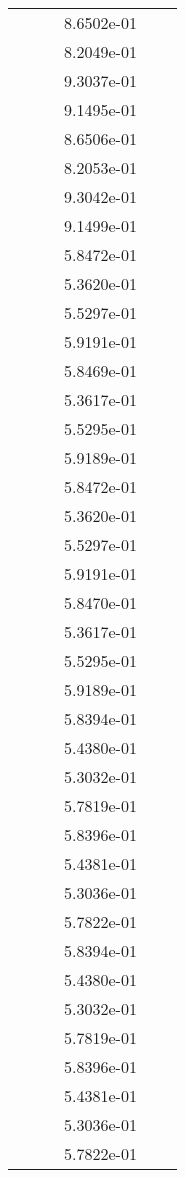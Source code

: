 \begin{xltabular}{\textwidth}{r|rS[table-format=1.3e+2]S[table-format=1.4e+2]S[table-format=1.4e+2]S[table-format=-1.5]}
&  &  & 8.6502e-01 & & \\
&  &  & 8.2049e-01 & & \\
&  &  & 9.3037e-01 & & \\
&  &  & 9.1495e-01 & & \\
&  &  & 8.6506e-01 & & \\
&  &  & 8.2053e-01 & & \\
&  &  & 9.3042e-01 & & \\
&  &  & 9.1499e-01 & & \\
&  &  & 5.8472e-01 & & \\
&  &  & 5.3620e-01 & & \\
&  &  & 5.5297e-01 & & \\
&  &  & 5.9191e-01 & & \\
&  &  & 5.8469e-01 & & \\
&  &  & 5.3617e-01 & & \\
&  &  & 5.5295e-01 & & \\
&  &  & 5.9189e-01 & & \\
&  &  & 5.8472e-01 & & \\
&  &  & 5.3620e-01 & & \\
&  &  & 5.5297e-01 & & \\
&  &  & 5.9191e-01 & & \\
&  &  & 5.8470e-01 & & \\
&  &  & 5.3617e-01 & & \\
&  &  & 5.5295e-01 & & \\
&  &  & 5.9189e-01 & & \\
&  &  & 5.8394e-01 & & \\
&  &  & 5.4380e-01 & & \\
&  &  & 5.3032e-01 & & \\
&  &  & 5.7819e-01 & & \\
&  &  & 5.8396e-01 & & \\
&  &  & 5.4381e-01 & & \\
&  &  & 5.3036e-01 & & \\
&  &  & 5.7822e-01 & & \\
&  &  & 5.8394e-01 & & \\
&  &  & 5.4380e-01 & & \\
&  &  & 5.3032e-01 & & \\
&  &  & 5.7819e-01 & & \\
&  &  & 5.8396e-01 & & \\
&  &  & 5.4381e-01 & & \\
&  &  & 5.3036e-01 & & \\
&  &  & 5.7822e-01 & & \\

\end{xltabular}
